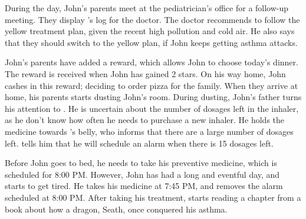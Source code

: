 During the day, John's parents meet at the pediatrician's office for a follow-up meeting. They display \app{}'s log for the doctor. The doctor recommends to follow the yellow treatment plan, given the recent high pollution and cold air. He also says that they should switch to the yellow plan, if John keeps getting asthma attacks.

John's parents have added a reward, which allows John to choose today's dinner. The reward is received when John has gained 2 stars. On his way home, John cashes in this reward; deciding to order pizza for the family. When they arrive at home, his parents starts dusting John's room. During dusting, John's father turns his attention to \buddy{}. He is uncertain about the number of dosages left in the inhaler, as he don't know how often he needs to purchase a new inhaler. He holds the medicine towards \buddy{}'s belly, who informs that there are a large number of dosages left. \buddy{} tells him that he will schedule an alarm when there is 15 dosages left. 

Before John goes to bed, he needs to take his preventive medicine, which is scheduled for 8:00 PM. However, John has had a long and eventful day, and starts to get tired. He takes his medicine at 7:45 PM, and \buddy{} removes the alarm scheduled at 8:00 PM. After taking his treatment, \buddy{} starts reading a chapter from a book about how a dragon, Seath, once conquered his asthma. 